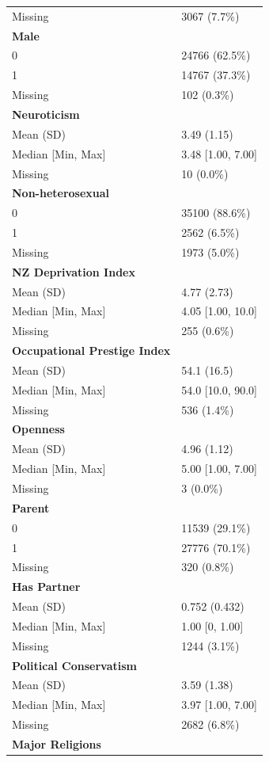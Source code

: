 \documentclass[
  single column]{article}
\begin{document}
\begin{longtable}[]{@{}ll@{}}
Missing & 3067 (7.7\%) \\
\textbf{Male} & \\
0 & 24766 (62.5\%) \\
1 & 14767 (37.3\%) \\
Missing & 102 (0.3\%) \\
\textbf{Neuroticism} & \\
Mean (SD) & 3.49 (1.15) \\
Median {[}Min, Max{]} & 3.48 {[}1.00, 7.00{]} \\
Missing & 10 (0.0\%) \\
\textbf{Non-heterosexual} & \\
0 & 35100 (88.6\%) \\
1 & 2562 (6.5\%) \\
Missing & 1973 (5.0\%) \\
\textbf{NZ Deprivation Index} & \\
Mean (SD) & 4.77 (2.73) \\
Median {[}Min, Max{]} & 4.05 {[}1.00, 10.0{]} \\
Missing & 255 (0.6\%) \\
\textbf{Occupational Prestige Index} & \\
Mean (SD) & 54.1 (16.5) \\
Median {[}Min, Max{]} & 54.0 {[}10.0, 90.0{]} \\
Missing & 536 (1.4\%) \\
\textbf{Openness} & \\
Mean (SD) & 4.96 (1.12) \\
Median {[}Min, Max{]} & 5.00 {[}1.00, 7.00{]} \\
Missing & 3 (0.0\%) \\
\textbf{Parent} & \\
0 & 11539 (29.1\%) \\
1 & 27776 (70.1\%) \\
Missing & 320 (0.8\%) \\
\textbf{Has Partner} & \\
Mean (SD) & 0.752 (0.432) \\
Median {[}Min, Max{]} & 1.00 {[}0, 1.00{]} \\
Missing & 1244 (3.1\%) \\
\textbf{Political Conservatism} & \\
Mean (SD) & 3.59 (1.38) \\
Median {[}Min, Max{]} & 3.97 {[}1.00, 7.00{]} \\
Missing & 2682 (6.8\%) \\
\textbf{Major Religions} & \\

\end{longtable}
\end{document}
